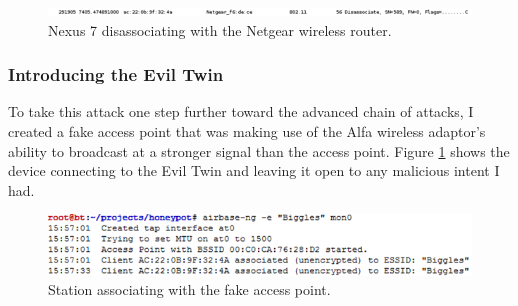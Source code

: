 \begin{figure}[h!]
\includegraphics[width=\linewidth]{research/attackvectors/figures/ddos-4.png}
\caption{Nexus 7 disassociating with the Netgear wireless router.}
\end{figure}

\subsubsection*{Introducing the Evil Twin}
To take this attack one step further toward the advanced chain of attacks, I created a fake access point that was making use of the Alfa wireless adaptor's ability to broadcast at a stronger signal than the access point. Figure \ref{ddos-5} shows the device connecting to the Evil Twin and leaving it open to any malicious intent I had.

\begin{figure}[h!]
\includegraphics[width=\linewidth]{research/attackvectors/figures/ddos-5.png}
\caption{Station associating with the fake access point.}
\label{ddos-5}
\end{figure}